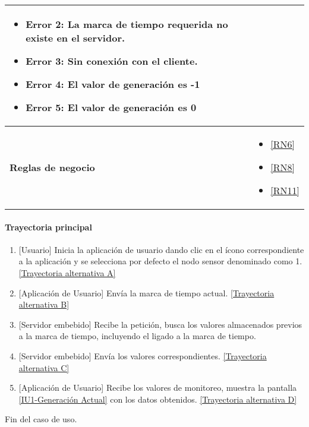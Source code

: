 \begin{longtable}{|J{5cm}|J{10.3cm}|}
\begin{itemize}
			\item \label{CUU1.2:Error2} Error 2: La marca de tiempo requerida no existe en el servidor.
		    \item \label{CUU1.2:Error3} Error 3: Sin conexión con el cliente.
		    \item \label{CUU1.2:Error4} Error 4: El valor de generación es -1
		    \item \label{CUU1.2:Error5} Error 5: El valor de generación es 0
		\end{itemize} \\ \hline
	\textbf{Reglas de negocio} & 
		\begin{itemize}
		    \item \ref{RN6}
			\item \ref{RN8}
			\item \ref{RN11}
		\end{itemize} \\ \hline
\end{longtable}

\paragraph{Trayectoria principal}
    \label{SUB-U-CU1.2:TP}
	\begin{enumerate}
	    \item {[Usuario]} Inicia la aplicación de usuario dando clic en el ícono correspondiente a la aplicación y se selecciona por defecto el nodo sensor denominado como 1. \hyperref[SUB-U-CU1.2:TA]{[Trayectoria alternativa A]}
	    \item {[Aplicación de Usuario]} Envía la marca de tiempo actual. \hyperref[SUB-U-CU1.2:TB]{[Trayectoria alternativa B]} 
	    \item {[Servidor embebido]} Recibe la petición, busca los valores almacenados previos a la marca de tiempo, incluyendo el ligado a la marca de tiempo.
	    \item {[Servidor embebido]} Envía los valores correspondientes. \hyperref[SUB-U-CU1.2:TC]{[Trayectoria alternativa C]} 
	    \item {[Aplicación de Usuario]} Recibe los valores de monitoreo, muestra la pantalla \hyperref[fig:monitoreo]{[IU1-Generación Actual]} con los datos obtenidos. \hyperref[SUB-U-CU1.2:TD]{[Trayectoria alternativa D]}
	\end{enumerate}
	Fin del caso de uso.


